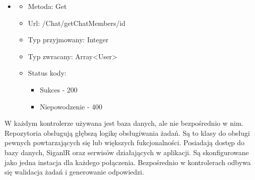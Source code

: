\documentclass[12pt,a4paper]{article}
\begin{document}
\begin{enumerate}
\begin{itemize}
	\item 
	\begin{itemize}
		\item Metoda: Get
		\item Url: /Chat/getChatMembers/{id}
		\item Typ przyjmowany: Integer
		\item Typ zwracany: Array<User>
		\item Status kody: 
		\begin{itemize}
			\item Sukces - 200
			\item Niepowodzenie - 400
		\end{itemize}
	\end{itemize}
	
\end{itemize}
\end{enumerate}

\hspace*{0.7cm} W każdym kontrolerze używana jest baza danych, ale nie bezpośrednio w nim. Repozytoria obsługują głębszą logikę obsługiwania żadań. Są to klasy do obsługi pewnych powtarzających się lub większych fukcjonalności. Posiadają dostęp do bazy danych, SiganlR oraz serwisów działających w aplikacji. Są skonfigurowane jako jedna instacja dla każdego połączenia. Bezpośrednio w kontrolerach odbywa się walidacja żadań i generowanie odpowiedzi.
\end{document}

